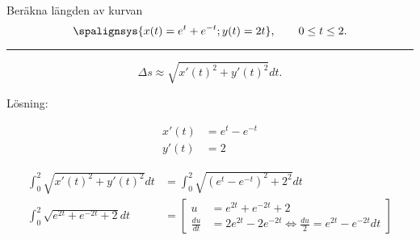 \documentclass[11pt]{article}
\begin{document}
Beräkna längden av kurvan
\[
    \spalignsys{
        x(t) = e^t + e^{-t};
        y(t) = 2t
    }
    ,\qquad
    0 \leq t \leq 2.
\]

\noindent\rule{\textwidth}{0.5pt}

\begin{equation}
    \Delta s \approx \sqrt{x'(t)^2 + y'(t)^2}dt.
    \label{eq:kurvlangd}
\end{equation}

Lösning:

\begin{align}
    x'(t) &= e^t - e^{-t}\\
    y'(t) &= 2
\end{align}

\begin{align}
    \int_0^2 \sqrt{x'(t)^2 + y'(t)^2} dt &= \int_0^2 \sqrt{\left(e^t - e^{-t}\right)^2 + 2^2} dt \\
    \int_0^2 \sqrt{e^{2t} + e^{-2t} + 2} dt &= \left[\begin{aligned}
        u &= e^{2t} + e^{-2t} + 2\\
        \frac{du}{dt} &= 2e^{2t} - 2e^{-2t} \Leftrightarrow \frac{du}{2} = e^{2t} - e^{-2t}dt
    \end{aligned}\right]
\end{align}
\end{document}
